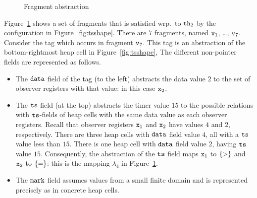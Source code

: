 \begin{figure}
\center
	
\caption{Fragment abstraction}
\label{fig:tsviewshape}
\end{figure} 

Figure~\ref{fig:tsviewshape} shows a set of fragments that is
satisfied wrp.\ to ${\tt th}_2$ by the configuration in Figure~\ref{fig:tsshape}.
There are $7$ fragments, named $\mathtt{v}_1$, \ldots , $\mathtt{v}_7$.
Consider the tag which occurs in fragment $\mathtt{v}_7$.
This tag is an abstraction of the
bottom-rightmost heap cell in Figure~\ref{fig:tsshape},
The different non-pointer fields are represented as follows.
\begin{itemize}
\item The $\tt data$ field of the tag (to the left) abstracts the data value
  $2$ to the set of observer registers with that value: in this case
  $\mathtt{x}_2$.
\item The $\tt ts$ field (at the top) abstracts the timer value $15$ to
  the possible relations with $\tt ts$-fields of heap cells with the same
  data value as each observer registers. Recall that observer registers
  $\mathtt{x}_1$ and $\mathtt{x}_2$ have values $4$ and $2$, respectively. There are
  three heap cells with $\tt data$ field value $4$, all with a $\tt ts$
  value less than $15$. There is one heap cell with
  $\tt data$ field value $2$, having $\tt ts$ value $15$.
  Consequently, the abstraction of the $\tt ts$ field maps $\mathtt{x}_1$ to
  $\left\{>\right\}$ and $\mathtt{x}_2$ to $\left\{=\right\}$: this is the mapping
  $\lambda_4$ in Figure~\ref{fig:tsviewshape}.
\item The $\tt mark$ field assumes values from a small finite domain and
  is represented precisely as in concrete heap cells.
\end{itemize}

